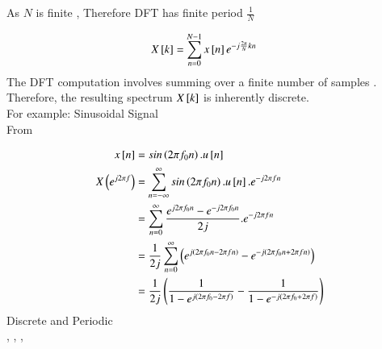 \documentclass[journal,12pt,onecolumn]{IEEEtran}
\theoremstyle{remark}
\begin{document}
As $N$ is finite , Therefore DFT has finite period $\frac{1}{N}$

\begin{align}
X{}\left[k\right]&=\sum_{n=0}^{N-1}x{}\left[n\right]e^{-j\frac{2\pi}{N}kn}
\end{align}
The DFT computation involves summing over a finite number of samples . Therefore, the resulting spectrum  $X{}\left[k\right]$ is inherently discrete.\\

For example:  Sinusoidal Signal\\

From 

\begin{align}
x{}\left[n\right]&=sin\left(2\pi f_0n\right).u{}\left[n\right]\\
X\left(e^{j2\pi f}\right)&= \sum_{n=-\infty}^{\infty} sin\left(2\pi f_0n\right).u{}\left[n\right].e^{-j2\pi fn}\\
&= \sum_{n=0}^{\infty} \frac{e^{j2\pi f_0n}- e^{-j2\pi f_0n}}{2j}. e^{-j2\pi fn}\\
&=\frac{1}{2j}\sum_{n=0}^{\infty} \left(e^{j\left(2\pi f_0n-2\pi fn\right)} -  e^{-j\left(2\pi f_0n+2\pi fn\right)} \right)\\
&= \frac{1}{2j} \left(\frac{1}{1-e^{j\left(2\pi f_0-2\pi f\right)}}  -  \frac{1}{1-e^{-j\left(2\pi f_0+ 2\pi f\right)}}\right)
\end{align}
Discrete and Periodic \\

 \textrightarrow {}   ,   \textrightarrow {}   ,    \textrightarrow {}   ,    \textrightarrow {}
\end{document}
